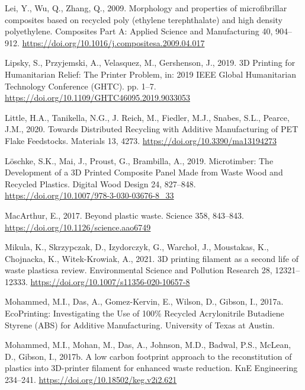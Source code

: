 \documentclass[
  12pt,
  number,
  review]{elsarticle}
\newlength{\cslhangindent}
\newlength{\cslentryspacingunit} %
\newenvironment{CSLReferences}[2] %
 {%
  \setlength{\parindent}{0pt}
  \ifodd #1
  \let\oldpar\par
  \def\par{\hangindent=\cslhangindent\oldpar}
  \fi
  \setlength{\parskip}{#2\cslentryspacingunit}
 }%
 {}
\begin{document}
\begin{CSLReferences}{1}{0}
\leavevmode{}%
Lei, Y., Wu, Q., Zhang, Q., 2009. Morphology and properties of
microfibrillar composites based on recycled poly (ethylene
terephthalate) and high density polyethylene. Composites Part A: Applied
Science and Manufacturing 40, 904--912.
\url{https://doi.org/10.1016/j.compositesa.2009.04.017}

\leavevmode{}%
Lipsky, S., Przyjemski, A., Velasquez, M., Gershenson, J., 2019. {3D
Printing} for {Humanitarian Relief}: {The Printer Problem}, in: 2019
{IEEE Global Humanitarian Technology Conference} ({GHTC}). pp. 1--7.
\url{https://doi.org/10.1109/GHTC46095.2019.9033053}

\leavevmode{}%
Little, H.A., Tanikella, N.G., J. Reich, M., Fiedler, M.J., Snabes,
S.L., Pearce, J.M., 2020. Towards {Distributed Recycling} with {Additive
Manufacturing} of {PET Flake Feedstocks}. Materials 13, 4273.
\url{https://doi.org/10.3390/ma13194273}

\leavevmode{}%
Löschke, S.K., Mai, J., Proust, G., Brambilla, A., 2019. Microtimber:
{The Development} of a {3D Printed Composite Panel Made} from {Waste
Wood} and {Recycled Plastics}. Digital Wood Design 24, 827--848.
\url{https://doi.org/10.1007/978-3-030-03676-8_33}

\leavevmode{}%
MacArthur, E., 2017. Beyond plastic waste. Science 358, 843--843.
\url{https://doi.org/10.1126/science.aao6749}

\leavevmode{}%
Mikula, K., Skrzypczak, D., Izydorczyk, G., Warchoł, J., Moustakas, K.,
Chojnacka, K., Witek-Krowiak, A., 2021. {3D} printing filament as a
second life of waste plastics\textemdash a review. Environmental Science
and Pollution Research 28, 12321--12333.
\url{https://doi.org/10.1007/s11356-020-10657-8}

\leavevmode{}%
Mohammed, M.I., Das, A., Gomez-Kervin, E., Wilson, D., Gibson, I.,
2017a. {EcoPrinting}: {Investigating} the {Use} of 100\% {Recycled
Acrylonitrile Butadiene Styrene} ({ABS}) for {Additive Manufacturing}.
{University of Texas at Austin}.

\leavevmode{}%
Mohammed, M.I., Mohan, M., Das, A., Johnson, M.D., Badwal, P.S., McLean,
D., Gibson, I., 2017b. A low carbon footprint approach to the
reconstitution of plastics into {3D-printer} filament for enhanced waste
reduction. KnE Engineering 234--241.
\url{https://doi.org/10.18502/keg.v2i2.621}


\end{CSLReferences}
\end{document}
